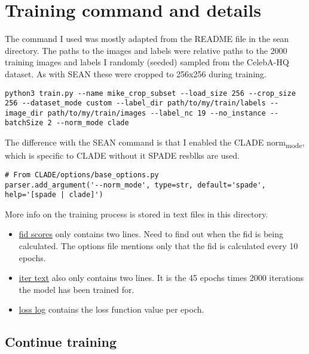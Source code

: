 \documentclass{memoir}
\author{Mike Vink}
\date{\today}
\title{}
\begin{document}
\tableofcontents


\chapter{Training command and details}
\label{sec:org9c41d80}

The command I used was mostly adapted from the README file in the sean
directory. The paths to the images and labels were relative paths to the 2000
training images and labels I randomly (seeded) sampled from the CelebA-HQ
dataset. As with SEAN these were cropped to 256x256 during training.

\begin{verbatim}
python3 train.py --name mike_crop_subset --load_size 256 --crop_size 256 --dataset_mode custom --label_dir path/to/my/train/labels --image_dir path/to/my/train/images --label_nc 19 --no_instance --batchSize 2 --norm_mode clade
\end{verbatim}

The difference with the SEAN command is that I enabled the CLADE norm\textsubscript{mode}, which is specific to CLADE without it SPADE resblks are used.

\begin{verbatim}
# From CLADE/options/base_options.py
parser.add_argument('--norm_mode', type=str, default='spade', help='[spade | clade]')
\end{verbatim}

More info on the training process is stored in text files in this directory.

\begin{itemize}
\item \href{fid.txt}{fid scores} only contains two lines. Need to find out when the fid is being
calculated. The options file mentions only that the fid is calculated every 10 epochs.
\item \href{iter.txt}{iter text} also only contains two lines. It is the 45 epochs times 2000
iterations the model has been trained for.
\item \href{loss\_log.txt}{loss log} contains the loss function value per epoch.
\end{itemize}

\section{Continue training}
\label{sec:org2becb53}
\end{document}
